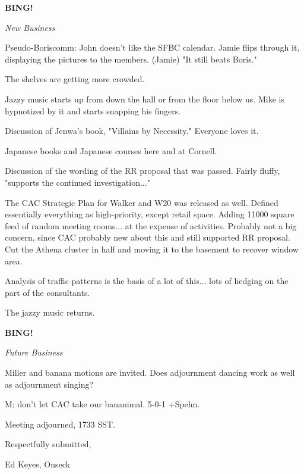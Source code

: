 \documentclass[12pt]{article}
\newcommand{\bing}{{\bf BING!} }
\newcommand{\goto}[1]{\bing \vskip 12pt \centerline{{\em{#1}}}}
\begin{document}
\goto{New Business}

Pseudo-Boriscomm: John doesn't like the SFBC calendar. Jamie flips through it, displaying the pictures to the members. (Jamie) "It still beats Boris."

The shelves are getting more crowded.

Jazzy music starts up from down the hall or from the floor below us. Mike is hypnotized by it and starts snapping his fingers.

Discussion of Jenwa's book, "Villains by Necessity." Everyone loves it.

Japanese books and Japanese courses here and at Cornell.

Discussion of the wording of the RR proposal that was passed. Fairly fluffy, "supports the continued investigation..."

The CAC Strategic Plan for Walker and W20 was released as well. Defined essentially everything as high-priority, except retail space. Adding 11000 square feed of random meeting rooms... at the expense of activities. Probably not a big concern, since CAC probably new about this and still supported RR proposal. Cut the Athena cluster in half and moving it to the basement to recover window area.

Analysis of traffic patterns is the basis of a lot of this... lots of hedging on the part of the consultants.

The jazzy music returns.

\goto{Future Business}

Miller and banana motions are invited. Does adjournment dancing work as well as adjournment singing?

M: don't let CAC take our bananimal. 5-0-1 +Spehn.

\vspace{12pt}

\noindent
Meeting adjourned, 1733 SST.

\vspace{18pt}

\centerline{Respectfully submitted,}
\centerline{Ed Keyes, Onseck}
\end{document}
